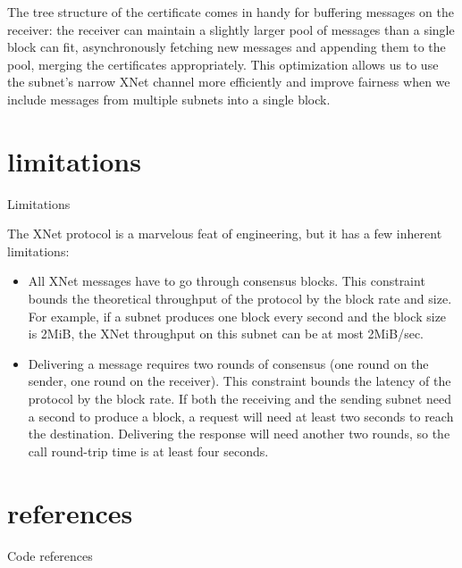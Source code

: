 \documentclass{article}
\begin{document}
The tree structure of the certificate comes in handy for buffering messages on the receiver: the receiver can maintain a slightly larger pool of messages than a single block can fit, asynchronously fetching new messages and appending them to the pool, merging the certificates appropriately.
This optimization allows us to use the subnet's narrow XNet channel more efficiently and improve fairness when we include messages from multiple subnets into a single block.

\section{limitations}{Limitations}

The XNet protocol is a marvelous feat of engineering, but it has a few inherent limitations:
\begin{itemize}
  \item
    All XNet messages have to go through consensus blocks.
    This constraint bounds the theoretical throughput of the protocol by the block rate and size.
    For example, if a subnet produces one block every second and the block size is 2MiB, the XNet throughput on this subnet can be at most 2MiB/sec.
  \item
    Delivering a message requires two rounds of consensus (one round on the sender, one round on the receiver).
    This constraint bounds the latency of the protocol by the block rate.
    If both the receiving and the sending subnet need a second to produce a block, a request will need at least two seconds to reach the destination.
    Delivering the response will need another two rounds, so the call round-trip time is at least four seconds.
\end{itemize}

\section{references}{Code references}
\end{document}
